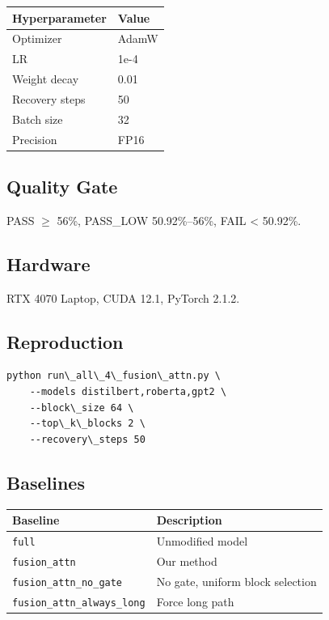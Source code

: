 \begin{table}[H]
\centering
\small
\begin{tabular}{ll}
\toprule
\textbf{Hyperparameter} & \textbf{Value} \\
\midrule
Optimizer & AdamW \\
LR & 1e-4 \\
Weight decay & 0.01 \\
Recovery steps & 50 \\
Batch size & 32 \\
Precision & FP16 \\
\bottomrule
\end{tabular}
\end{table}

\subsection{Quality Gate}

PASS $\ge$ 56\%, PASS\_LOW 50.92\%--56\%, FAIL \textless{} 50.92\%.

\subsection{Hardware}

RTX 4070 Laptop, CUDA 12.1, PyTorch 2.1.2.

\subsection{Reproduction}

\begin{lstlisting}
python run\_all\_4\_fusion\_attn.py \
    --models distilbert,roberta,gpt2 \
    --block\_size 64 \
    --top\_k\_blocks 2 \
    --recovery\_steps 50
\end{lstlisting}

\subsection{Baselines}

\begin{table}[H]
\centering
\small
\begin{tabular}{ll}
\toprule
\textbf{Baseline} & \textbf{Description} \\
\midrule
\texttt{full} & Unmodified model \\
\texttt{fusion\_attn} & Our method \\
\texttt{fusion\_attn\_no\_gate} & No gate, uniform block selection \\
\texttt{fusion\_attn\_always\_long} & Force long path \\
\bottomrule
\end{tabular}
\end{table}

